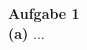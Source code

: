 \documentclass[a4paper,12pt]{article}
\begin{document}
\raggedright
\doublespacing
\noindent\textbf{Aufgabe 1} \\
\noindent\textbf{(a)} ...  
\end{document}
